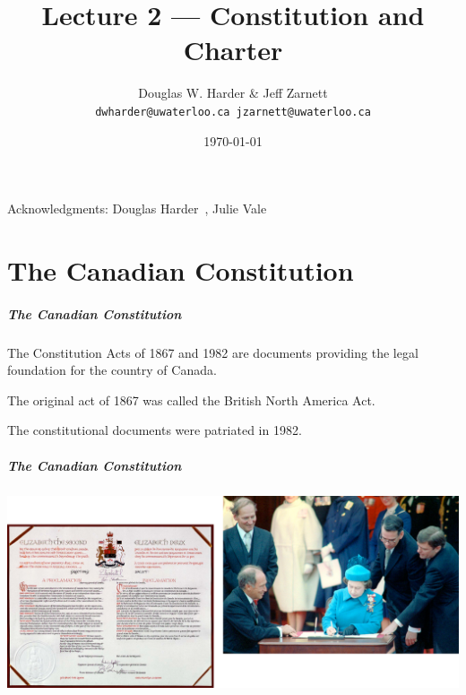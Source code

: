 

\title{Lecture 2 --- Constitution and Charter }

\author{Douglas W. Harder \& Jeff Zarnett \\ \small \texttt{dwharder@uwaterloo.ca}~\texttt{jzarnett@uwaterloo.ca}}
\date{\today}




\begin{frame}
  \titlepage

\begin{center}
  \small{Acknowledgments: Douglas Harder~\cite{dwh}, Julie Vale~\cite{jv}}
  \end{center}
\end{frame}


\part{The Canadian Constitution}
\begin{frame}
\partpage

\end{frame}

\begin{frame}
\frametitle{The Canadian Constitution}

The Constitution Acts of 1867 and 1982 are documents providing the legal foundation for the country of Canada.

The original act of 1867 was called the British North America Act.

The constitutional documents were patriated in 1982. 

\end{frame}



\begin{frame}
\frametitle{The Canadian Constitution}

\begin{center}
\includegraphics[width=\textwidth]{images/canadian-constitution.png}
\end{center}

\end{frame}



